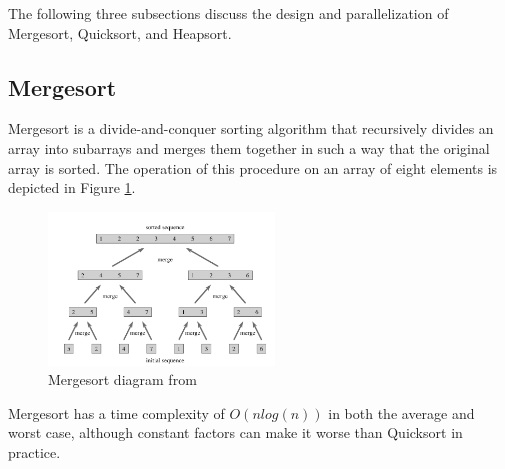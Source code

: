 \documentclass[conference]{IEEEtran}
\begin{document}
	The following three subsections discuss the design and parallelization of Mergesort, Quicksort, and Heapsort.
	
	\subsection{Mergesort}
	Mergesort is a divide-and-conquer sorting algorithm that recursively divides an array into subarrays and merges them together in such a way that the original array is sorted.
	The operation of this procedure on an array of eight elements is depicted in Figure \ref{mrg}.  
	\begin{figure}[h]
		\includegraphics[width=6cm]{merge.png}
		\caption{Mergesort diagram from \cite{cormen_introduction_2009}}
		\label{mrg}
	\end{figure}
	Mergesort has a time complexity of $O(nlog(n))$ in both the average and worst case, although constant factors can make it worse than Quicksort in practice.
	
\end{document}

